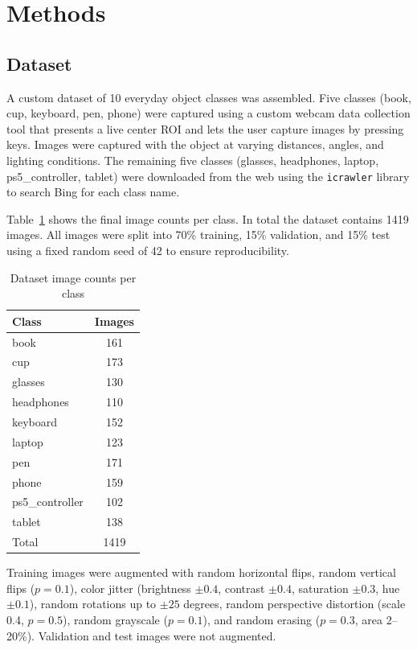 \documentclass[conference]{IEEEtran}
\begin{document}
\section{Methods}

\subsection{Dataset}

A custom dataset of 10 everyday object classes was assembled. Five classes
(book, cup, keyboard, pen, phone) were captured using a custom webcam data
collection tool that presents a live center ROI and lets the user capture
images by pressing keys. Images were captured with the object at varying
distances, angles, and lighting conditions. The remaining five classes
(glasses, headphones, laptop, ps5\_controller, tablet) were downloaded from
the web using the \texttt{icrawler} library to search Bing for each class name.

Table~\ref{tab:dataset} shows the final image counts per class. In total the
dataset contains 1419 images. All images were split into 70\% training,
15\% validation, and 15\% test using a fixed random seed of 42 to ensure
reproducibility.

\begin{table}[h]
\centering
\caption{Dataset image counts per class}
\label{tab:dataset}
\begin{tabular}{lc}
\toprule
Class & Images \\
\midrule
book & 161 \\
cup & 173 \\
glasses & 130 \\
headphones & 110 \\
keyboard & 152 \\
laptop & 123 \\
pen & 171 \\
phone & 159 \\
ps5\_controller & 102 \\
tablet & 138 \\
\midrule
Total & 1419 \\
\bottomrule
\end{tabular}
\end{table}

Training images were augmented with random horizontal flips, random vertical
flips ($p=0.1$), color jitter (brightness $\pm0.4$, contrast $\pm0.4$,
saturation $\pm0.3$, hue $\pm0.1$), random rotations up to $\pm25$ degrees,
random perspective distortion (scale 0.4, $p=0.5$), random grayscale
($p=0.1$), and random erasing ($p=0.3$, area 2--20\%). Validation and test
images were not augmented.
\end{document}
